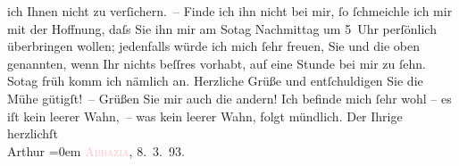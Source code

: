                ich Ihnen nicht zu verſichern. – Finde ich ihn nicht bei mir, ſo ſchmeichle ich mir
               mit der Hoffnung, daſs Sie ihn mir am So{\geminationn}tag{ }Nachmittag um 5 Uhr perſönlich überbringen wollen; jedenfalls würde ich
                  {\pb}mich ſehr freuen, Sie und die oben genannten,
               wenn Ihr nichts beſſres vorhabt, auf eine Stunde bei mir zu ſehn. So{\geminationn}tag früh komm ich nämlich an.\pend
           \pstart
           Herzliche Grüße und entſchuldigen Sie die Mühe gütigſt! – Grüßen Sie mir auch die
               andern! Ich befinde mich ſehr wohl – {\pb}es iſt kein
               leerer Wahn, – was kein leerer Wahn, folgt mündlich.\pend
           \pstart
           Der Ihrige herzlichſt{\\[\baselineskip]}\spacefill\mbox{Arthur}\pend
           \leftskip=0em{}\pstart
           \textcolor{pink}{\textsc{Abbazia}}{}\ledrightnote{\textcolor{pink}{Opatija}}, 8. 3. 93.\pend
           \endnumbering{}  
      